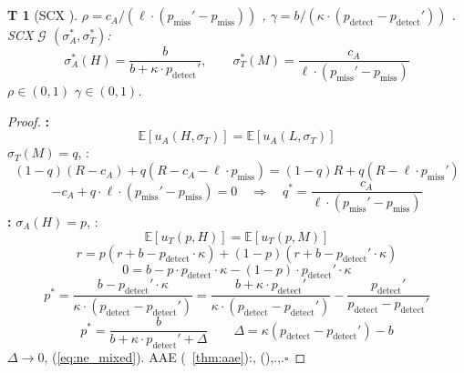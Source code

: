 \documentclass[12pt,a4paper]{article}
\newtheorem{theorem}Theorem[section]
\theoremstyle{remark}
\newcommand{\E}{\mathbb{E}}
\newcommand{\cG}{\mathcal{G}}
\begin{document}
{\subsection{}
\begin{theorem}[SCX ]\label{thm:audit_ne}
 $\rho = c_A / (\ell \cdot (p_{\text{miss}}' - p_{\text{miss}}))$ , 
$\gamma = b / (\kappa \cdot (p_{\text{detect}} - p_{\text{detect}}'))$ .
SCX $\cG$ $(\sigma_A^*, \sigma_T^*)$: 
\begin{equation}\label{eq:ne_mixed}
 \sigma_A^*(H) = \frac{b}{b + \kappa \cdot p_{\text{detect}}'}, \qquad
 \sigma_T^*(M) = \frac{c_A}{\ell \cdot (p_{\text{miss}}' - p_{\text{miss}})}
\end{equation}
 $\rho \in (0, 1)$ $\gamma \in (0, 1)$.
\end{theorem}
\begin{proof}
\textbf{: }
\[
\E[u_A(H, \sigma_T)] = \E[u_A(L, \sigma_T)]
\]
 $\sigma_T(M) = q$, : 
\[
(1 - q)(R - c_A) + q(R - c_A - \ell \cdot p_{\text{miss}}) = (1 - q)R + q(R - \ell \cdot p_{\text{miss}}')
\]
\[
-c_A + q \cdot \ell \cdot (p_{\text{miss}}' - p_{\text{miss}}) = 0 \quad \Rightarrow \quad q^* = \frac{c_A}{\ell \cdot (p_{\text{miss}}' - p_{\text{miss}})}
\]
\textbf{: }
 $\sigma_A(H) = p$, : 
\[
\E[u_T(p, H)] = \E[u_T(p, M)]
\]
\[
r = p(r + b - p_{\text{detect}} \cdot \kappa) + (1 - p)(r + b - p_{\text{detect}}' \cdot \kappa)
\]
\[
0 = b - p \cdot p_{\text{detect}} \cdot \kappa - (1 - p) \cdot p_{\text{detect}}' \cdot \kappa
\]
\[
p^* = \frac{b - p_{\text{detect}}' \cdot \kappa}{\kappa \cdot (p_{\text{detect}} - p_{\text{detect}}')} = \frac{b + \kappa \cdot p_{\text{detect}}'}{\kappa \cdot (p_{\text{detect}} - p_{\text{detect}}')} - \frac{p_{\text{detect}}'}{p_{\text{detect}} - p_{\text{detect}}'}
\]
\[
p^* = \frac{b}{b + \kappa \cdot p_{\text{detect}}' + \Delta} \quad \text{} \quad \Delta = \kappa(p_{\text{detect}} - p_{\text{detect}}') - b
\]
 $\Delta \to 0$, (\ref{eq:ne_mixed}).
 AAE (~\ref{thm:aae}):, (),.,.$\square$
\end{proof}
}
\end{document}
